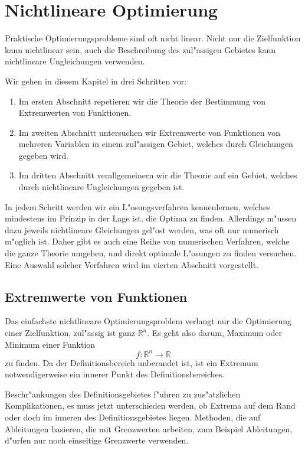 \chapter{Nichtlineare Optimierung\label{chapter-nichtlineare-optimierung}}
Praktische Optimierungsprobleme sind oft nicht linear. 
Nicht nur die Zielfunktion kann nichtlinear sein, auch die
Beschreibung des zul"assigen Gebietes kann nichtlineare Ungleichungen
verwenden. 

Wir gehen in diesem Kapitel in drei Schritten vor:
\begin{enumerate}
\item Im ersten Abschnitt repetieren wir die Theorie der Bestimmung
von Extremwerten von Funktionen.
\item Im zweiten Abschnitt untersuchen wir Extremwerte von Funktionen
von mehreren Variablen in einem zul"assigen Gebiet, welches durch
Gleichungen gegeben wird.
\item Im dritten Abschnitt verallgemeinern wir die Theorie auf
ein Gebiet, welches durch nichtlineare Ungleichungen gegeben ist.
\end{enumerate}
In jedem Schritt werden wir ein L"osungsverfahren kennenlernen,
welches mindestens im Prinzip in der Lage ist, die Optima zu
finden.
Allerdings m"ussen dazu jeweils nichtlineare Gleichungen
gel"ost werden, was oft nur numerisch m"oglich ist.
Daher gibt es auch eine Reihe von numerischen Verfahren, welche die ganze
Theorie umgehen, und direkt optimale L"osungen zu finden versuchen.
Eine Auswahl solcher Verfahren wird im vierten Abschnitt vorgestellt.

\section{Extremwerte von Funktionen\label{nlp:extremwerte}}
Das einfachste nichtlineare Optimierungsproblem verlangt nur die
Optimierung einer Zielfunktion, zul"assig ist ganz $\mathbb R^n$.
Es geht also darum, Maximum oder Minimum einer Funktion
\[
f\colon \mathbb R^n\to\mathbb R
\]
zu finden. Da der Definitionsbereich unberandet ist, ist ein
Extremum notwendigerweise ein innerer Punkt des Definitionsbereiches.

Beschr"ankungen des Definitionsgebietes f"uhren
zu zus"atzlichen Komplikationen, es muss jetzt unterschieden
werden, ob Extrema auf dem Rand oder doch im inneren des Definitionsgebietes
liegen.
Methoden, die auf Ableitungen basieren, die mit Grenzwerten
arbeiten, zum Beispiel Ableitungen, d"urfen nur noch einseitige
Grenzwerte verwenden.

